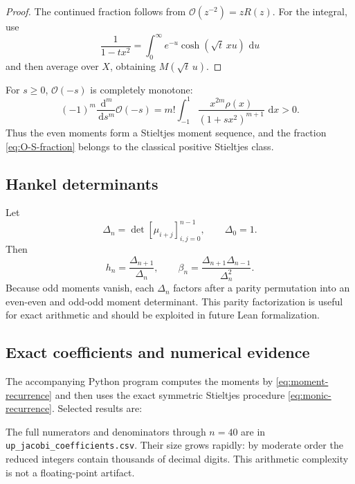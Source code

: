 \documentclass[11pt]{article}
\theoremstyle{definition}
\theoremstyle{remark}
\newcommand{\dd}{\,\mathrm d}
\newcommand{\cO}{\mathcal O}
\begin{document}
\begin{proof}
The continued fraction follows from \(\cO(z^{-2})=zR(z)\).  For the integral, use
\[
 \frac1{1-tx^2}=\int_0^{\infty}e^{-u}\cosh(\sqrt t\,xu)\,\dd u
\]
and then average over \(X\), obtaining \(M(\sqrt t\,u)\).
\end{proof}

For \(s\ge0\), \(\cO(-s)\) is completely monotone:
\begin{equation}
 (-1)^m\frac{\dd^m}{\dd s^m}\cO(-s)
 =m!\int_{-1}^{1}\frac{x^{2m}\rho(x)}{(1+sx^2)^{m+1}}\,\dd x>0. \label{eq:O-complete-monotone}
\end{equation}
Thus the even moments form a Stieltjes moment sequence, and the fraction
\eqref{eq:O-S-fraction} belongs to the classical positive Stieltjes class.

\subsection{Hankel determinants}

Let
\begin{equation}
 \Delta_n=\det[\mu_{i+j}]_{i,j=0}^{n-1},\qquad \Delta_0=1.  \label{eq:Hankel}
\end{equation}
Then
\begin{equation}
 h_n=\frac{\Delta_{n+1}}{\Delta_n},
 \qquad
 \boxed{\beta_n=\frac{\Delta_{n+1}\Delta_{n-1}}{\Delta_n^2}}. \label{eq:beta-Hankel}
\end{equation}
Because odd moments vanish, each \(\Delta_n\) factors after a parity permutation into an
even-even and odd-odd moment determinant.  This parity factorization is useful for exact
arithmetic and should be exploited in future Lean formalization.

\subsection{Exact coefficients and numerical evidence}

The accompanying Python program computes the moments by
\eqref{eq:moment-recurrence} and then uses the exact symmetric Stieltjes procedure
\eqref{eq:monic-recurrence}.  Selected results are:

\begin{center}

\end{center}

The full numerators and denominators through \(n=40\) are in
\texttt{up\_jacobi\_coefficients.csv}.  Their size grows rapidly: by moderate order the
reduced integers contain thousands of decimal digits.  This arithmetic complexity is not a
floating-point artifact.
\end{document}

